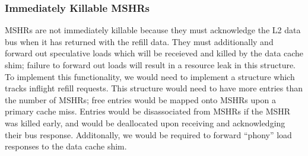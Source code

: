 \subsubsection{Immediately Killable MSHRs}
MSHRs are not immediately killable because they must acknowledge the L2 data bus when it has returned with the refill data. They must additionally and forward out speculative loads which will be receieved and killed by the data cache shim; failure to forward out loads will result in a resource leak in this structure. To implement this functionality, we would need to implement a structure which tracks inflight refill requests. This structure would need to have more entries than the number of MSHRs; free entries would be mapped onto MSHRs upon a primary cache miss. Entries would be disassociated from MSHRs if the MSHR was killed early, and would be deallocated upon receiving and acknowledging their bus response. Additonally, we would be required to forward ``phony'' load responses to the data cache shim.
